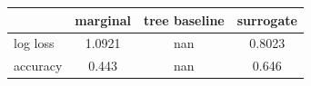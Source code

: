 \begin{tabular}{lccc}
\toprule
 & marginal & tree baseline & surrogate \\
\midrule
log loss & 1.0921 & nan & 0.8023 \\
accuracy & 0.443 & nan & 0.646 \\
\bottomrule
\end{tabular}
